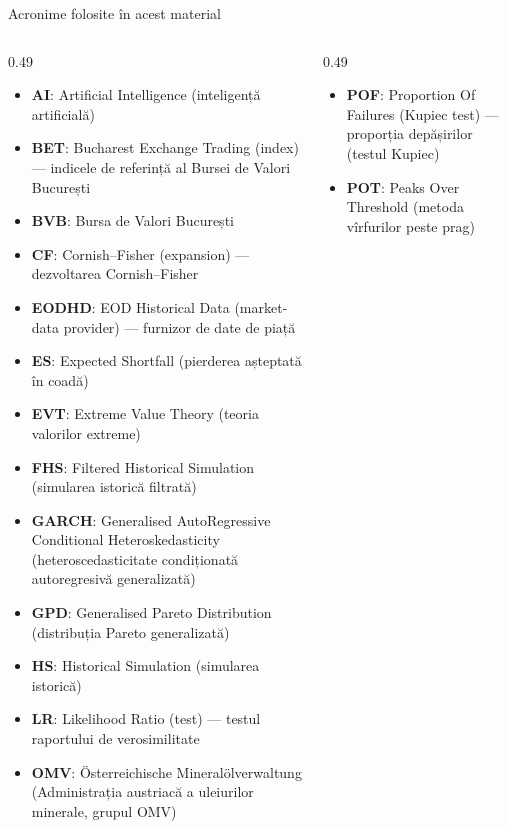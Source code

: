 {
\begin{frame}[noframenumbering]
    \titlepage
\end{frame}
}
\begin{frame}{Acronime folosite în acest material}
\begin{columns}[T]
\begin{column}{0.49\textwidth}
\begin{itemize}\setlength{\itemsep}{0pt}
    \item \textbf{AI}: Artificial Intelligence (inteligență artificială)
    \item \textbf{BET}: Bucharest Exchange Trading (index) — indicele de referință al Bursei de Valori București
    \item \textbf{BVB}: Bursa de Valori București
    \item \textbf{CF}: Cornish–Fisher (expansion) — dezvoltarea Cornish–Fisher
    \item \textbf{EODHD}: EOD Historical Data (market-data provider) — furnizor de date de piață
    \item \textbf{ES}: Expected Shortfall (pierderea așteptată în coadă)
    \item \textbf{EVT}: Extreme Value Theory (teoria valorilor extreme)
    \item \textbf{FHS}: Filtered Historical Simulation (simularea istorică filtrată)
    \item \textbf{GARCH}: Generalised AutoRegressive Conditional Heteroskedasticity (heteroscedasticitate condiționată autoregresivă generalizată)
    \item \textbf{GPD}: Generalised Pareto Distribution (distribuția Pareto generalizată)
    \item \textbf{HS}: Historical Simulation (simularea istorică)
    \item \textbf{LR}: Likelihood Ratio (test) — testul raportului de verosimilitate
    \item \textbf{OMV}: Österreichische Mineralölverwaltung (Administrația austriacă a uleiurilor minerale, grupul OMV)
\end{itemize}
\end{column}
\begin{column}{0.49\textwidth}
\begin{itemize}\setlength{\itemsep}{0pt}
    \item \textbf{POF}: Proportion Of Failures (Kupiec test) — proporția depășirilor (testul Kupiec)
    \item \textbf{POT}: Peaks Over Threshold (metoda vîrfurilor peste prag)
\end{itemize}
\end{column}
\end{columns}
\end{frame}


